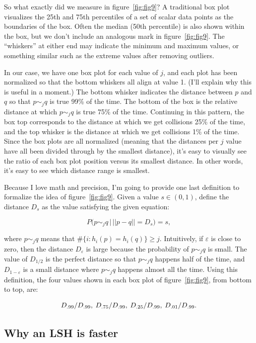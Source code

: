 \documentclass[20pt,]{extarticle}
\begin{document}
So what exactly did we measure in figure~\ref{fig:fig9}? A traditional
box plot visualizes the 25th and 75th percentiles of a set of scalar
data points as the boundaries of the box. Often the median (50th
percentile) is also shown within the box, but we don't include an
analogous mark in figure~\ref{fig:fig9}. The ``whiskers'' at either end
may indicate the minimum and maximum values, or something similar such
as the extreme values after removing outliers.

In our case, we have one box plot for each value of \(j\), and each plot
has been normalized so that the bottom whiskers all align at value 1.
(I'll explain why this is useful in a moment.) The bottom whisker
indicates the distance between \(p\) and \(q\) so that \(p\sim_j q\) is
true 99\% of the time. The bottom of the box is the relative distance at
which \(p\sim_j q\) is true 75\% of the time. Continuing in this
pattern, the box top corresponds to the distance at which we get
collisions 25\% of the time, and the top whisker is the distance at
which we get collisions 1\% of the time. Since the box plots are all
normalized (meaning that the distances per \(j\) value have all been
divided through by the smallest distance), it's easy to visually see the
ratio of each box plot position versus its smallest distance. In other
words, it's easy to see which distance range is smallest.

Because I love math and precision, I'm going to provide one last
definition to formalize the idea of figure~\ref{fig:fig9}. Given a value
\(s \in (0, 1)\), define the distance \(D_s\) as the value satisfying
the given equation:

\[ P\big(p \sim_j q \, \big| \, ||p-q|| = D_s\big) = s, \]

where \(p\sim_j q\) means that \(\#\{i : h_i(p) = h_i(q)\} \ge j.\)
Intuitively, if \(\varepsilon\) is close to zero, then the distance
\(D_\varepsilon\) is large because the probability of \(p\sim_j q\) is
small. The value of \(D_{1/2}\) is the perfect distance so that
\(p \sim_j q\) happens half of the time, and \(D_{1-\varepsilon}\) is a
small distance where \(p \sim_j q\) happens almost all the time. Using
this definition, the four values shown in each box plot of
figure~\ref{fig:fig9}, from bottom to top, are:

\[D_{.99} / D_{.99} ,\;\;{\hskip -0.3em}
D_{.75} / D_{.99}   ,\;\;{\hskip -0.3em}
D_{.25} / D_{.99}   ,\;\;{\hskip -0.3em}
D_{.01} / D_{.99}.\]

\subsection{Why an LSH is faster}\label{why-an-lsh-is-faster}
\end{document}
